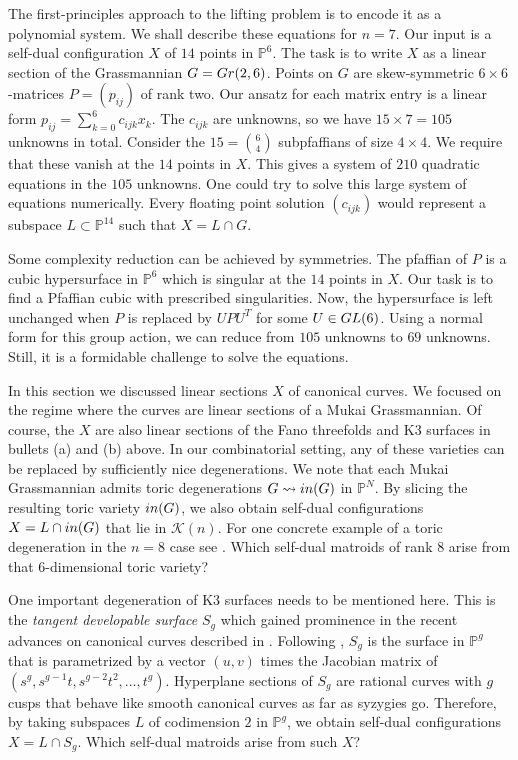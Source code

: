 \documentclass[12pt]{extarticle}
\theoremstyle{definition}
\numberwithin{theorem}{section}
\theoremstyle{plain}\newtheorem{ithm}{Theorem}
\newcommand{\PP}{\mathbb{P}}
\begin{document}
The first-principles approach to the lifting problem is to encode it as
a polynomial system.
We shall describe these equations for $n=7$.
Our input is a self-dual configuration $X$ of $14$ points in $\PP^6$.
The task is to write $X$ as a linear section of the Grassmannian $G ={\rm Gr}(2,6)$.
Points on $G$ are skew-symmetric 
$6 \times 6$-matrices $P = (p_{ij})$ of rank two.  Our ansatz for each 
 matrix entry is a linear form $p_{ij} = \sum_{k=0}^6 c_{ijk} x_k$.
The $c_{ijk}$ are unknowns, so we have $15 \times 7 = 105$ unknowns in total.
Consider the $15 = \binom{6}{4}$ subpfaffians of size $4 \times 4$.
We require that these vanish at the $14$ points in $X$.
This gives a system of $210$ quadratic equations in the $105$ unknowns.
One could try to solve this large system of equations numerically.
Every floating point solution $(c_{ijk})$ would represent a
subspace $L \subset \PP^{14}$ such that $X = L \cap  G$.

Some complexity reduction can be achieved by
symmetries. The pfaffian of $P$ is
a cubic hypersurface in $\PP^6$ which is
singular at the $14$ points in $X$.
Our task is to find a Pfaffian cubic with 
prescribed singularities. Now, the hypersurface
is left unchanged when $P$ is replaced by
$U P U^T$ for some $U \in {\rm GL}(6)$.
Using a normal form for this group action,
we can reduce from $105$ unknowns to $ 69$ unknowns.
Still, it is a formidable challenge to
solve the equations.

In this section we discussed linear sections $X$ of canonical curves.
We focused on the regime where the
curves are linear sections of a
 Mukai Grassmannian. Of course, the $X$
  are also linear sections of the
Fano threefolds and K3 surfaces in bullets (a) and (b) above.
In our combinatorial setting, any of these
varieties can be replaced by sufficiently nice degenerations.
We note that each Mukai Grassmannian admits
toric degenerations $G \leadsto  {\rm in}(G) $ in $\PP^N$.
By slicing the resulting  toric variety ${\rm in}(G)$, we  also obtain
self-dual configurations $X = L \cap {\rm in}(G)$ that lie in $\mathcal{K}(n)$.
For one concrete example of a toric degeneration in the $n=8$ case see
 \cite[Figure 3]{Boege}.
Which self-dual matroids of rank $8$
arise from that $6$-dimensional toric variety?

One important degeneration of K3 surfaces needs to be
mentioned here. This is the {\em tangent developable surface} $S_g$
which gained prominence in the recent advances on 
canonical curves described  in \cite{EL}.
Following \cite[Equation (2.2)]{EL}, 
$S_g$ is the surface in $\PP^g$ that is parametrized by
a vector $(u,v)$ times the Jacobian matrix
of $(s^g, s^{g-1} t, s^{g-2} t^2, \ldots, t^g)$.
Hyperplane sections of $S_g$ are rational curves with $g$ cusps
that behave like smooth canonical curves as far
as syzygies go. Therefore, by taking subspaces $L$ of codimension $2$ in $\PP^g$,
we obtain self-dual configurations $X = L \cap S_g$.
Which self-dual matroids arise from such $X$?
\end{document}
